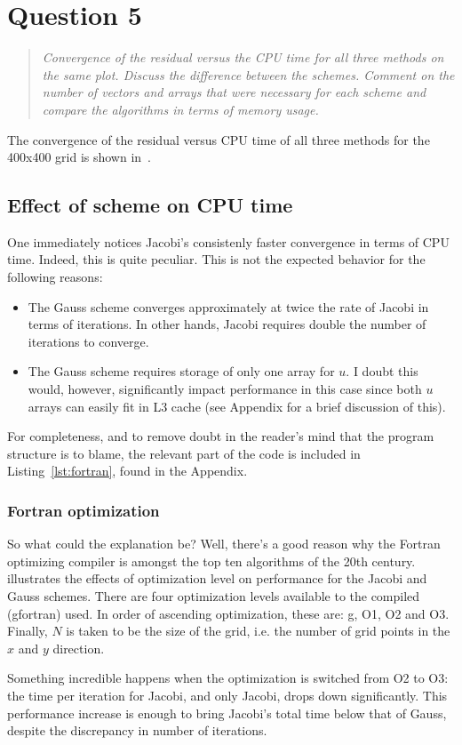 \documentclass{SelimArticle}
\begin{document}
\section{Question 5}
\begin{quote}
    \textit{Convergence of the residual versus the CPU time for all three methods on the same
        plot. Discuss the difference between the schemes. Comment on the number of vectors
        and arrays that were necessary for each scheme and compare the algorithms in terms
        of memory usage.}
\end{quote}
The convergence of the residual versus CPU time of all three methods for the 400x400 grid is shown
in~.

\subsection{Effect of scheme on CPU time}
One immediately notices Jacobi's consistenly faster convergence in terms of CPU time. Indeed, this is
quite peculiar. This is not the expected behavior for the following reasons:
\begin{itemize}[noitemsep]
    \item The Gauss scheme converges approximately at twice the rate of Jacobi in terms of iterations. In other hands,
        Jacobi requires double the number of iterations to converge.
    \item The Gauss scheme requires storage of only one array for $u$. I doubt this would, however, significantly
        impact performance in this case since both $u$ arrays can easily fit in L3 cache
        (see Appendix for a brief discussion of this).
\end{itemize}
For completeness, and to remove doubt in the reader's mind that the program structure
is to blame, the relevant part of the code is included in Listing~\ref{lst:fortran}, found in the Appendix.

\subsubsection{Fortran optimization}
So what could the explanation be? Well, there's a good reason why the Fortran optimizing compiler
is amongst the top ten algorithms of the 20th century.  illustrates the
effects of optimization level on performance for the Jacobi and Gauss schemes. There are four
optimization levels available to the compiled (gfortran) used. In order of ascending
optimization, these are: g, O1, O2 and O3. Finally, $N$ is taken to be the size of the grid, i.e.
the number of grid points in the $x$ and $y$ direction.

Something incredible happens when the optimization is switched from O2 to O3: the time
per iteration for Jacobi, and only Jacobi, drops down significantly. This performance increase is
enough to bring Jacobi's total time below that of Gauss, despite the discrepancy in number of
iterations.
\end{document}
